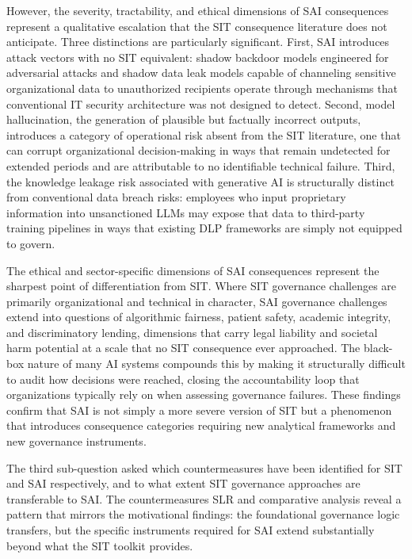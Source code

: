 \documentclass[12pt,oneside]{article}
\begin{document}
However, the severity, tractability, and ethical dimensions of \ac{SAI} consequences represent a qualitative escalation that the \ac{SIT} consequence literature does not anticipate. Three distinctions are particularly significant. First, \ac{SAI} introduces attack vectors with no \ac{SIT} equivalent: shadow backdoor models engineered for adversarial attacks and shadow data leak models capable of channeling sensitive organizational data to unauthorized recipients operate through mechanisms that conventional \ac{IT} security architecture was not designed to detect. Second, model hallucination, the generation of plausible but factually incorrect outputs, introduces a category of operational risk absent from the \ac{SIT} literature, one that can corrupt organizational decision-making in ways that remain undetected for extended periods and are attributable to no identifiable technical failure. Third, the knowledge leakage risk associated with generative \ac{AI} is structurally distinct from conventional data breach risks: employees who input proprietary information into unsanctioned \ac{LLM}s may expose that data to third-party training pipelines in ways that existing \ac{DLP} frameworks are simply not equipped to govern.

The ethical and sector-specific dimensions of \ac{SAI} consequences represent the sharpest point of differentiation from \ac{SIT}. Where \ac{SIT} governance challenges are primarily organizational and technical in character, \ac{SAI} governance challenges extend into questions of algorithmic fairness, patient safety, academic integrity, and discriminatory lending, dimensions that carry legal liability and societal harm potential at a scale that no \ac{SIT} consequence ever approached. The black-box nature of many \ac{AI} systems compounds this by making it structurally difficult to audit how decisions were reached, closing the accountability loop that organizations typically rely on when assessing governance failures. These findings confirm that \ac{SAI} is not simply a more severe version of \ac{SIT} but a phenomenon that introduces consequence categories requiring new analytical frameworks and new governance instruments.

The third sub-question asked which countermeasures have been identified for \ac{SIT} and \ac{SAI} respectively, and to what extent \ac{SIT} governance approaches are transferable to \ac{SAI}. The countermeasures \ac{SLR} and comparative analysis reveal a pattern that mirrors the motivational findings: the foundational governance logic transfers, but the specific instruments required for \ac{SAI} extend substantially beyond what the \ac{SIT} toolkit provides.
\end{document}
